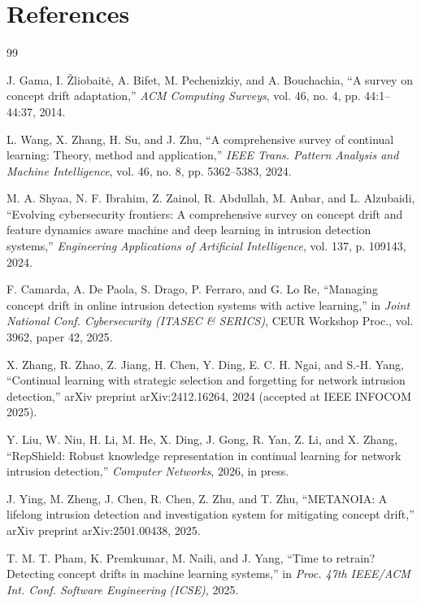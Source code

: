\documentclass{article}
\begin{document}
	\section{References}
	\renewcommand{\refname}{}
	\begin{thebibliography}{99}

J. Gama, I. \v{Z}liobait\.{e}, A. Bifet, M. Pechenizkiy, and A. Bouchachia,
``A survey on concept drift adaptation,''
\textit{ACM Computing Surveys}, vol. 46, no. 4, pp. 44:1--44:37, 2014.

L. Wang, X. Zhang, H. Su, and J. Zhu,
``A comprehensive survey of continual learning: Theory, method and application,''
\textit{IEEE Trans. Pattern Analysis and Machine Intelligence}, vol. 46, no. 8, pp. 5362--5383, 2024.

M. A. Shyaa, N. F. Ibrahim, Z. Zainol, R. Abdullah, M. Anbar, and L. Alzubaidi,
``Evolving cybersecurity frontiers: A comprehensive survey on concept drift and feature dynamics aware machine and deep learning in intrusion detection systems,''
\textit{Engineering Applications of Artificial Intelligence}, vol. 137, p. 109143, 2024.

F. Camarda, A. De Paola, S. Drago, P. Ferraro, and G. Lo Re,
``Managing concept drift in online intrusion detection systems with active learning,''
in \textit{Joint National Conf. Cybersecurity (ITASEC \& SERICS)}, CEUR Workshop Proc., vol. 3962, paper 42, 2025.

X. Zhang, R. Zhao, Z. Jiang, H. Chen, Y. Ding, E. C. H. Ngai, and S.-H. Yang,
``Continual learning with strategic selection and forgetting for network intrusion detection,''
arXiv preprint arXiv:2412.16264, 2024 (accepted at IEEE INFOCOM 2025).

Y. Liu, W. Niu, H. Li, M. He, X. Ding, J. Gong, R. Yan, Z. Li, and X. Zhang,
``RepShield: Robust knowledge representation in continual learning for network intrusion detection,''
\textit{Computer Networks}, 2026, in press.

J. Ying, M. Zheng, J. Chen, R. Chen, Z. Zhu, and T. Zhu,
``METANOIA: A lifelong intrusion detection and investigation system for mitigating concept drift,''
arXiv preprint arXiv:2501.00438, 2025.

T. M. T. Pham, K. Premkumar, M. Naili, and J. Yang,
``Time to retrain? Detecting concept drifts in machine learning systems,''
in \textit{Proc. 47th IEEE/ACM Int. Conf. Software Engineering (ICSE)}, 2025.


\end{thebibliography}
\end{document}

